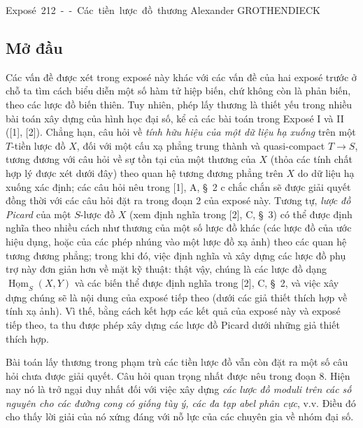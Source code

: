 \unit{Exposé 212 -- Các tiền lược đồ thương}
%
  {Alexander GROTHENDIECK}

\subsection*{Mở đầu}

Các vấn đề được xét trong exposé này khác với các vấn đề của hai exposé trước
ở chỗ ta tìm cách biểu diễn một số hàm tử hiệp biến, chứ không còn là phản
biến, theo các lược đồ biến thiên. Tuy nhiên, phép lấy thương là thiết yếu
trong nhiều bài toán xây dựng của hình học đại số, kể cả các bài toán trong
Exposé I và II ([1], [2]). Chẳng hạn, câu hỏi về \emph{tính hữu hiệu của một
dữ liệu hạ xuống} trên một $T$-tiền lược đồ $X$, đối với một cấu xạ phẳng
trung thành và quasi-compact $T\longrightarrow S$, tương đương với câu hỏi về
sự tồn tại của một thương của $X$ (thỏa các tính chất hợp lý được xét dưới
đây) theo quan hệ tương đương phẳng trên $X$ do dữ liệu hạ xuống xác định; các
câu hỏi nêu trong [1], A, \S~2 c chắc chắn sẽ được giải quyết đồng thời với
các câu hỏi đặt ra trong đoạn 2 của exposé này. Tương tự, \emph{lược đồ
Picard} của một $S$-lược đồ $X$ (xem định nghĩa trong [2], C, \S~3) có thể
được định nghĩa theo nhiều cách như thương của một số lược đồ khác (các lược
đồ của ước hiệu dụng, hoặc của các phép nhúng vào một lược đồ xạ ảnh) theo
các quan hệ tương đương phẳng; trong khi đó, việc định nghĩa và xây dựng các
lược đồ phụ trợ này đơn giản hơn về mặt kỹ thuật: thật vậy, chúng là các lược
đồ dạng $\underline{\operatorname{Hom}}_S(X,Y)$ và các biến thể được định
nghĩa trong [2], C, \S~2, và việc xây dựng chúng sẽ là nội dung của exposé
tiếp theo (dưới các giả thiết thích hợp về tính xạ ảnh). Vì thế, bằng cách kết
hợp các kết quả của exposé này và exposé tiếp theo, ta thu được phép xây dựng
các lược đồ Picard dưới những giả thiết thích hợp.

Bài toán lấy thương trong phạm trù các tiền lược đồ vẫn còn đặt ra một số câu
hỏi chưa được giải quyết. Câu hỏi quan trọng nhất được nêu trong đoạn 8. Hiện
nay nó là trở ngại duy nhất đối với việc xây dựng \emph{các lược đồ moduli
trên các số nguyên cho các đường cong có giống tùy ý, các đa tạp abel phân
cực}, v.v. Điều đó cho thấy lời giải của nó xứng đáng với nỗ lực của các
chuyên gia về nhóm đại số.
